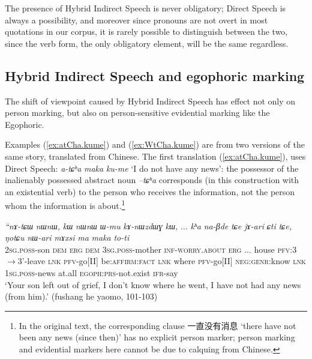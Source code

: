 \documentclass[oldfontcommands,oneside,a4paper,11pt]{article}
\newcommand{\ipa}[1]{{\phon\textit{#1}}} %
\newcommand{\zh}[1]{{\cn #1}}
\newcommand{\refb}[1]{(\ref{#1})}
\newcommand{\bleu}[1]{{\color{blue}#1}}
\begin{document}
 The presence of Hybrid Indirect Speech is never obligatory; Direct Speech is always a possibility, and moreover since pronouns are not overt in most quotations in our corpus, it is rarely possible to distinguish between the two, since the verb form, the only obligatory element, will be the same regardless.
 
\subsection{Hybrid Indirect Speech and egophoric marking}
The shift of viewpoint caused by Hybrid Indirect Speech has effect not only on person marking, but also on person-sensitive evidential marking like the Egophoric.

Examples  \refb{ex:atCha.kume} and \refb{ex:WtCha.kume} are from two versions of the same story, translated from Chinese. The first translation \refb{ex:atCha.kume}, uses Direct Speech: \ipa{a-tɕʰa}  \ipa{maka} 	\ipa{ku-me} `I do not have any news': the possessor of the inalienably possessed abstract noun \ipa{--tɕʰa} corresponds (in this construction with an existential verb) to the person who receives the information, not the person whom the information is about.\footnote{In the original text, the corresponding clause \zh{一直没有消息} `there have not been any news (since then)' has no explicit person marker; person marking and evidential markers here cannot be due to calquing from Chinese. }
 

\begin{exe}
\ex \label{ex:atCha.kume}
 \gll %
 \ipa{``nɤ-tɕɯ} 	\ipa{nɯnɯ,} 	\ipa{kɯ} 	\ipa{nɯnɯ} 	\ipa{ɯ-mu} 	\ipa{kɤ-nɯzdɯɣ} 	\ipa{kɯ,} 	... 	\ipa{kʰa} 	\ipa{na-βde} 	\ipa{tɕe} 	 	\ipa{jɤ-ari} 	\ipa{ɕti} 	\ipa{tɕe,} 	\ipa{ŋotɕu} 	\ipa{nɯ-ari} 	\ipa{mɤxsi} 	\ipa{ma} 	\bleu{\ipa{a-tɕʰa}} 	\ipa{maka} 	\bleu{\ipa{ku-me"}} 	\ipa{to-ti}  \\
\textsc{2sg.poss}-son \textsc{dem} \textsc{erg} \textsc{dem} \textsc{3sg.poss}-mother \textsc{inf}-\textsc{worry.about}  \textsc{erg} ... house \textsc{pfv}:3$\rightarrow$3'-leave \textsc{lnk} \textsc{pfv}-go[II] be:\textsc{affirm:fact} \textsc{lnk} where \textsc{pfv}-go[II] \textsc{neg:genr}:know \textsc{lnk} \bleu{\textsc{1sg.poss}-news} at.all \bleu{\textsc{egoph:prs}-not.exist} \textsc{ifr}-say \\
\glt `Your son left out of grief, I don't know where he went, I have not had any news (from him).' (fushang he yaomo, 101-103)
\end{exe}
\end{document}
